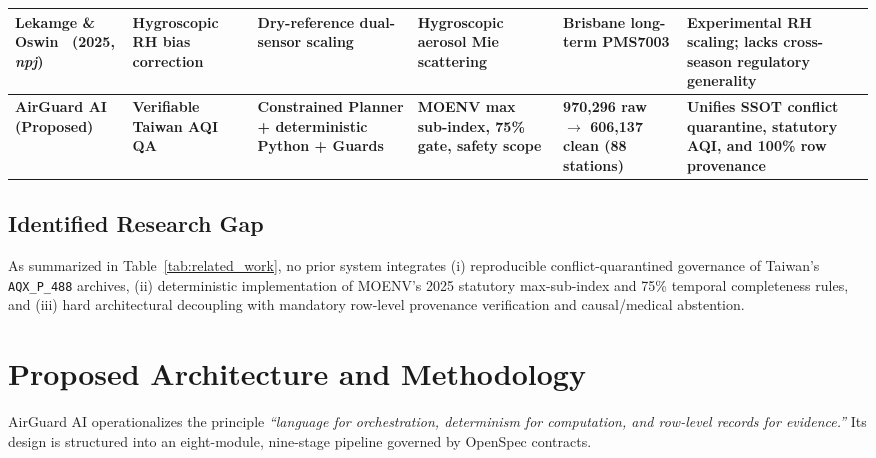 \documentclass[conference]{IEEEtran}
\begin{document}
\begin{table}[!t]
\begin{tabularx}{\textwidth}{@{}L{2.0cm} L{2.4cm} L{2.6cm} L{2.5cm} L{2.4cm} Y@{}}
Lekamge \& Oswin~\cite{lekamge2025rh} (2025, \emph{npj}) & Hygroscopic RH bias correction & Dry-reference dual-sensor scaling & Hygroscopic aerosol Mie scattering & Brisbane long-term PMS7003 & Experimental RH scaling; lacks cross-season regulatory generality \\
\midrule
\textbf{AirGuard AI (Proposed)} & \textbf{Verifiable Taiwan AQI QA} & \textbf{Constrained Planner + deterministic Python + Guards} & \textbf{MOENV max sub-index, 75\% gate, safety scope} & \textbf{970,296 raw $\rightarrow$ 606,137 clean (88 stations)} & \textbf{Unifies SSOT conflict quarantine, statutory AQI, and 100\% row provenance} \\
\bottomrule
\end{tabularx}
\end{table}

\subsection{Identified Research Gap}
As summarized in Table~\ref{tab:related_work}, no prior system integrates (i) reproducible conflict-quarantined governance of Taiwan's \texttt{AQX\_P\_488} archives, (ii) deterministic implementation of MOENV's 2025 statutory max-sub-index and 75\% temporal completeness rules, and (iii) hard architectural decoupling with mandatory row-level provenance verification and causal/medical abstention.

\section{Proposed Architecture and Methodology}
AirGuard AI operationalizes the principle \emph{``language for orchestration, determinism for computation, and row-level records for evidence.''} Its design is structured into an eight-module, nine-stage pipeline governed by OpenSpec contracts.
\end{document}
